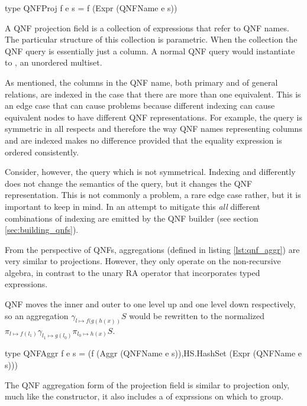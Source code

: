 \begin{code}
  \begin{haskellcode}
    type QNFProj f e s = f (Expr (QNFName e s))
  \end{haskellcode}
  \caption{\label{lst:qnf_proj}A QNF projection field is a collection of
    expressions that refer to QNF names. The particular structure of
    this collection is parametric. When the collection 
    the QNF query is essentially just a column. A normal QNF query
    would instantiate  to , an unordered
    multiset.}
\end{code}

As mentioned, the columns in the QNF name, both primary and of general
relations, are indexed in the case that there are more than one
equivalent. This is an edge case that can cause problems because
different indexing can cause equivalent nodes to have different QNF
representations. For example, the query  is symmetric in all respects and therefore
the way QNF names representing columns  and  are
indexed makes no difference provided that the equality expression
 is ordered consistently.


Consider, however, the query  which is not symmetrical. Indexing  and
 differently does not change the semantics of the query, but
it changes the QNF representation. This is not commonly a problem, a
rare edge case rather, but it is important to keep in mind.  In an
attempt to mitigate this \emph{all} different combinations of indexing
are emitted by the QNF builder (see section \ref{sec:building_qnfs}).

From the perspective of QNFs, aggregations (defined in listing
\ref{lst:qnf_aggr}) are very similar to projections. However, they
only operate on the non-recursive  algebra, in contrast to
the  unary RA operator that incorporates  typed expressions.

QNF moves the inner and outer  to one level up and one
level down respectively, so an aggregation \(\gamma_{l \mapsto
f(g(h(x))} S\) would be rewritten to the normalized \(\pi_{l \mapsto
f(l_1)} \gamma_{l_1 \mapsto g(l_0)} \pi_{l_0 \mapsto h(x)} S\).

\begin{code}
  \begin{haskellcode}
    type QNFAggr f e s =
    (f (Aggr (QNFName e s)),HS.HashSet (Expr (QNFName e s)))
  \end{haskellcode}
  \caption{\label{lst:qnf_aggr} The QNF aggregation form of the
    projection field is similar to projection only, much like the
     constructor, it also includes a  of
    exprssions on which to group.}
\end{code}

